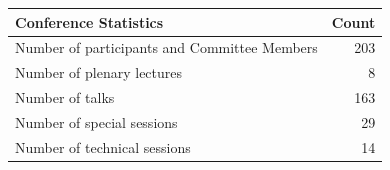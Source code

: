 \begin{table}[h]
\centering
\begin{tabular}{|l|r|}
\hline
\textbf{Conference Statistics} & \textbf{Count} \\
\hline
Number of participants and Committee Members & 203 \\
\hline
Number of plenary lectures & 8 \\
\hline
Number of talks & 163 \\
\hline
Number of special sessions & 29 \\
\hline
Number of technical sessions & 14 \\
\hline
\end{tabular}
\end{table}
